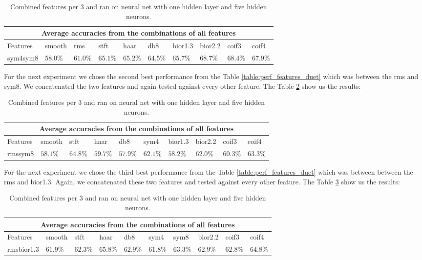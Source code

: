 \begin{table}[h!]
\renewcommand{\arraystretch}{1.3}
\begin{tabular}{ |p{1.6cm}||p{1.2cm}|p{1cm}|p{1cm}|p{1cm}|p{1cm}|p{1.1cm}|p{1.1cm}|p{1cm}|p{1cm}|  }
 \hline
 \multicolumn{10}{|c|}{Average accuracies from the combinations of all features} \\
 \hline
 Features  & smooth & rms & stft & haar & db8 & bior1.3 & bior2.2 & coif3 & coif4\\
 \hline
 sym4sym8  & $58.0\%$ &$61.0\%$ &$65.1\%$ &$65.2\%$ &$64.5\%$ &$65.7\%$ &\cellcolor{blue!35}$68.7\%$ &\cellcolor{blue!35}$68.4\%$ &$67.9\%$\\
 \hline
\end{tabular}
\caption{Combined features per 3 and ran on neural net with one hidden layer and five hidden neurons.}
\label{table:sym4sym8}
\end{table}
For the next experiment we chose the second best performance from the Table \ref{table:perf_features_duet} which was between the rms and sym8. We concatenated the two features and again tested against every other feature. The Table \ref{table:rmssym8} show us the results:
\begin{table}[h!]
\renewcommand{\arraystretch}{1.3}
\begin{tabular}{ |p{1.6cm}||p{1.2cm}|p{1cm}|p{1cm}|p{1cm}|p{1cm}|p{1.1cm}|p{1.1cm}|p{1cm}|p{1cm}|  }
 \hline
 \multicolumn{10}{|c|}{Average accuracies from the combinations of all features} \\
 \hline
 Features  & smooth & stft & haar & db8 &sym4 & bior1.3 & bior2.2 & coif3 & coif4\\
 \hline
 rmssym8  & $58.1\%$ &\cellcolor{blue!35}$64.8\%$ &$59.7\%$ &$57.9\%$ &$62.1\%$ &$58.2\%$ &$62.0\%$ &$60.3\%$ &\cellcolor{blue!35}$63.3\%$\\
 \hline
\end{tabular}
\caption{Combined features per 3 and ran on neural net with one hidden layer and five hidden neurons.}
\label{table:rmssym8}
\end{table}
\newpage
For the next experiment we chose the third best performance from the Table \ref{table:perf_features_duet} which was between between the rms and bior1.3. Again, we concatenated these two features and tested against every other feature. The Table \ref{table:rmsbior13} show us the results:
\begin{table}[h!]
\renewcommand{\arraystretch}{1.3}
\begin{tabular}{ |p{1.6cm}||p{1.2cm}|p{1cm}|p{1cm}|p{1cm}|p{1cm}|p{1cm}|p{1.1cm}|p{1cm}|p{1cm}|  }
 \hline
 \multicolumn{10}{|c|}{Average accuracies from the combinations of all features} \\
 \hline
 Features  & smooth & stft & haar & db8 & sym4 & sym8 & bior2.2 & coif3 & coif4\\
 \hline
 rmsbior1.3  & $61.9\%$ &$62.3\%$ &\cellcolor{blue!35}$65.8\%$ &$62.9\%$ &$61.8\%$ &$63.3\%$ &$62.9\%$ &$62.8\%$ &\cellcolor{blue!35}$64.8\%$\\
 \hline
\end{tabular}
\caption{Combined features per 3 and ran on neural net with one hidden layer and five hidden neurons.}
\label{table:rmsbior13}
\end{table}
